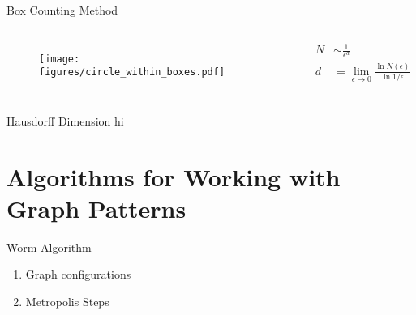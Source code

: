 \documentclass[10pt]{beamer}
\begin{document}
\begin{frame}{Box Counting Method}
    \begin{columns}[c]
        \column{1.5in}
        \begin{figure}[h!]
            \centering
            \texttt{[image: figures/circle\_within\_boxes.pdf]}
        \end{figure}
        \column{1.5in}
            \begin{align*}
                N &\sim \frac{1}{\epsilon^d} \\
                d &= \lim_{\epsilon \to 0} \frac{\ln N(\epsilon)}{\ln 1 / \epsilon}
            \end{align*}
    \end{columns}
\end{frame}



\begin{frame}{Hausdorff Dimension}
    hi
\end{frame}

\section{Algorithms for Working with Graph Patterns}

\begin{frame}{Worm Algorithm}
    \begin{enumerate}[$\bullet$]
        \item Graph configurations
        \item Metropolis Steps
    \end{enumerate}
\end{frame}
\end{document}

